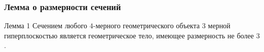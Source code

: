 \documentclass[10pt,pdf,hyperref={unicode}]{beamer}
\begin{document}
\begin{frame}
	\frametitle{Лемма о размерности сечений}

{\small
	\begin{block}{Лемма 1}
		Сечением любого $4$-мерного геометрического объекта $3$ мерной гиперплоскостью является геометрическое тело, имеющее размерность не более $3$. 
	\end{block}
}
	\begin{columns}
	\end{columns}
\end{frame}
\end{document}

